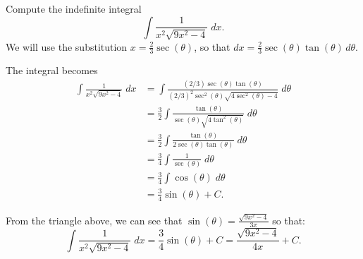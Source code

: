 \documentclass{ximera}
\begin{document}
\begin{example}[example 7]
Compute the indefinite integral
\[
\int \frac{1}{x^2\sqrt{9x^2-4}} \; dx.
\]
We will use the substitution $x = \frac23\sec(\theta)$,
so that $dx = \frac23\sec(\theta)\tan(\theta) \, d\theta$.

The integral becomes
\begin{align*}
\int \frac{1}{x^2\sqrt{9x^2-4}}\; dx &= \int \frac{(2/3)\sec(\theta)\tan(\theta)}{(2/3)^2\sec^2(\theta)\sqrt{4\sec^2(\theta)-4}}\; d\theta\\[6pt]
                                 &=  \frac32\int \frac{\tan(\theta)}{\sec(\theta)\sqrt{4\tan^2(\theta)}}\; d\theta\\[6pt]
                                 &=  \frac32\int \frac{\tan(\theta)}{2\sec(\theta)\tan(\theta)}\; d\theta\\[6pt]
                                  &=  \frac34 \int \frac{1}{\sec(\theta)} \; d\theta\\[6pt]
                                  &= \frac34 \int \cos(\theta)  \; d\theta\\[6pt]
                                  &= \frac34 \sin(\theta) + C.
\end{align*}


\begin{image}
\end{image}




From the triangle above, we can see that $\sin(\theta) = \frac{\sqrt{9x^2-4}}{3x}$ so that:
\[
\int \frac{1}{x^2\sqrt{9x^2-4}} \; dx =  \frac34 \sin(\theta) + C =  \frac{\sqrt{9x^2 - 4}}{4x} + C.
\]

\end{example}
\end{document}
